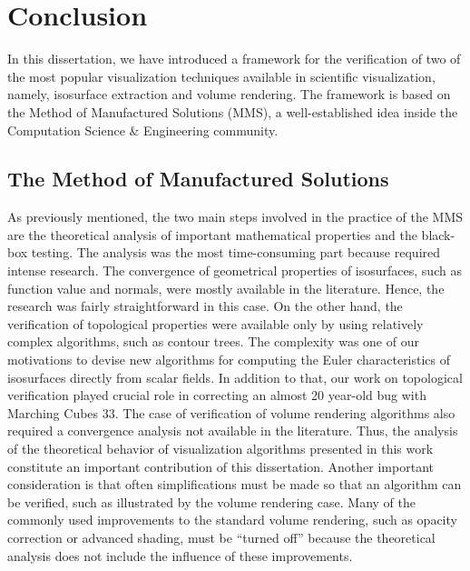 \chapter{Conclusion}
\label{chap:conclusion}


In this dissertation, we have introduced a framework for the verification of two of the most popular visualization techniques available in scientific visualization, namely, isosurface extraction and volume rendering. The framework is based on the Method of Manufactured Solutions (MMS), a well-established idea inside the Computation Science \& Engineering community. 


\section{The Method of Manufactured Solutions}

As previously mentioned, the two main steps involved in the practice of the MMS are the theoretical analysis of important mathematical properties and the black-box testing. 
%
The analysis was the most time-consuming part because required intense research.
%
%
%
The convergence of geometrical properties of isosurfaces, such as function value and normals, were mostly available in the literature. Hence, the research was fairly straightforward in this case.
%
On the other hand, the verification of topological properties were available only by using relatively complex algorithms, such as contour trees. 
%
The complexity was one of our motivations to devise new algorithms for computing the Euler characteristics of isosurfaces directly from scalar fields.
%
In addition to that, our work on topological verification played crucial role in correcting an almost 20 year-old bug with Marching Cubes 33.
%
The case of verification of volume rendering algorithms also required a convergence analysis not available in the literature. 
%
Thus, the analysis of the theoretical behavior of visualization algorithms presented in this work constitute an important contribution of this dissertation. 
%
Another important consideration is that often simplifications must be made so that an algorithm can be verified, such as illustrated 
by the volume rendering case.
%
Many of the commonly used improvements to the standard volume rendering, such as opacity correction or advanced shading, must be ``turned off'' because the theoretical analysis does not include the influence of these improvements.

